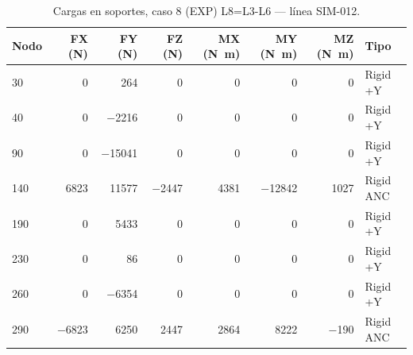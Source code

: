 \begin{table}[htbp]
  \centering
  \footnotesize
  \caption{Cargas en soportes, caso 8 (EXP) L8=L3-L6 — línea SIM-012.}
  \label{tab:restricciones-exp}
  \begin{tabular}{lrrrrrrl}
    \toprule
    Nodo & FX (\si{N}) & FY (\si{N}) & FZ (\si{N}) & MX (\si{N.m}) & MY (\si{N.m}) & MZ (\si{N.m}) & Tipo \\
    \midrule
    30 & \num{0} & \num{264} & \num{0} & \num{0} & \num{0} & \num{0} & Rigid +Y \\
    40 & \num{0} & \num{-2216} & \num{0} & \num{0} & \num{0} & \num{0} & Rigid +Y \\
    90 & \num{0} & \num{-15041} & \num{0} & \num{0} & \num{0} & \num{0} & Rigid +Y \\
    140 & \num{6823} & \num{11577} & \num{-2447} & \num{4381} & \num{-12842} & \num{1027} & Rigid ANC \\
    190 & \num{0} & \num{5433} & \num{0} & \num{0} & \num{0} & \num{0} & Rigid +Y \\
    230 & \num{0} & \num{86} & \num{0} & \num{0} & \num{0} & \num{0} & Rigid +Y \\
    260 & \num{0} & \num{-6354} & \num{0} & \num{0} & \num{0} & \num{0} & Rigid +Y \\
    290 & \num{-6823} & \num{6250} & \num{2447} & \num{2864} & \num{8222} & \num{-190} & Rigid ANC \\
    \bottomrule
  \end{tabular}
\end{table}
